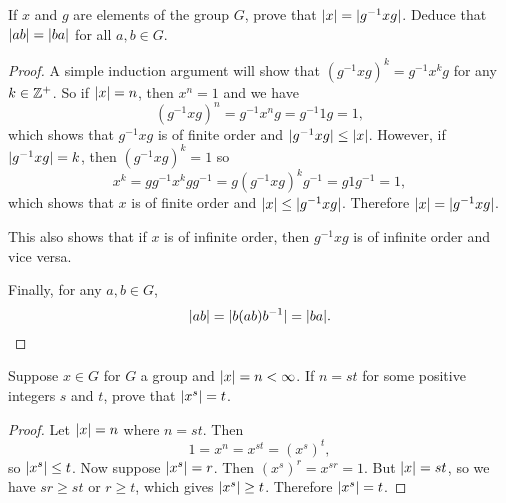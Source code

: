  If $x$ and $g$ are elements of the group $G$, prove that
$\lvert{x}\rvert = \lvert{g^{-1}xg}\rvert$. Deduce that $\lvert{ab}\rvert = \lvert{ba}\rvert$ for all
$a,b\in G$.
\begin{proof}
  A simple induction argument will show that
  $(g^{-1}xg)^k = g^{-1}x^kg$ for any $k\in\mathbb{Z}^+$. So if $\lvert{x}\rvert = n$,
  then $x^n = 1$ and we have
  \begin{equation*}
    (g^{-1}xg)^n = g^{-1}x^ng = g^{-1}1g = 1,
  \end{equation*}
  which shows that $g^{-1}xg$ is of finite order and
  $\lvert{g^{-1}xg}\rvert \leq \lvert{x}\rvert$. However, if $\lvert{g^{-1}xg}\rvert = k$,
  then $(g^{-1}xg)^k = 1$ so
  \begin{equation*}
    x^k = gg^{-1}x^kgg^{-1} = g(g^{-1}xg)^kg^{-1} = g1g^{-1} = 1,
  \end{equation*}
  which shows that $x$ is of finite order and
  $\lvert{x}\rvert \leq \lvert{g^{-1}xg}\rvert$. Therefore $\lvert{x}\rvert = \lvert{g^{-1}xg}\rvert$.

  This also shows that if $x$ is of infinite order, then $g^{-1}xg$ is
  of infinite order and vice versa.

  Finally, for any $a,b\in G$,
  \begin{equation*}
    \lvert{ab}\rvert = \lvert{b(ab)b^{-1}}\rvert = \lvert{ba}\rvert. \qedhere
  \end{equation*}
\end{proof}

 Suppose $x\in G$ for $G$ a group and
$\lvert{x}\rvert = n < \infty$. If $n = st$ for some positive integers $s$ and
$t$, prove that $\lvert{x^s}\rvert = t$.
\begin{proof}
  Let $\lvert{x}\rvert = n$ where $n = st$. Then
  \begin{equation*}
    1 = x^n = x^{st} = (x^s)^t,
  \end{equation*}
  so $\lvert{x^s}\rvert\leq t$. Now suppose $\lvert{x^s}\rvert = r$. Then
  $(x^s)^r = x^{sr} = 1$. But $\lvert{x}\rvert = st$, so we have $sr\geq st$
  or $r\geq t$, which gives $\lvert{x^s}\rvert\geq t$. Therefore
  $\lvert{x^s}\rvert = t$.
\end{proof}

